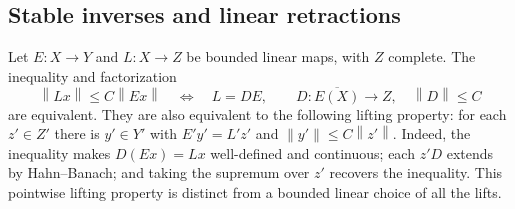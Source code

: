 \documentclass[11pt,a4paper]{amsart}
\numberwithin{equation}{section}
\theoremstyle{definition}
\theoremstyle{remark}
\newcommand{\norm}[1]{\left\lVert#1\right\rVert}
\begin{document}
\subsection{Stable inverses and linear retractions}
Let $E:X\to Y$ and $L:X\to Z$ be bounded linear maps, with $Z$ complete. The inequality and factorization
\begin{equation}\label{eq:stablefactor}
 \norm{Lx}\le C\norm{Ex}
 \quad\Longleftrightarrow\quad
 L=DE,\qquad D:\overline{E(X)}\to Z,\quad\norm D\le C
\end{equation}
are equivalent. They are also equivalent to the following lifting property: for each $z'\in Z'$ there is $y'\in Y'$ with $E'y'=L'z'$ and $\norm{y'}\le C\norm{z'}$. Indeed, the inequality makes $D(Ex)=Lx$ well-defined and continuous; each $z'D$ extends by Hahn--Banach; and taking the supremum over $z'$ recovers the inequality. This pointwise lifting property is distinct from a bounded linear choice of all the lifts.
\end{document}

